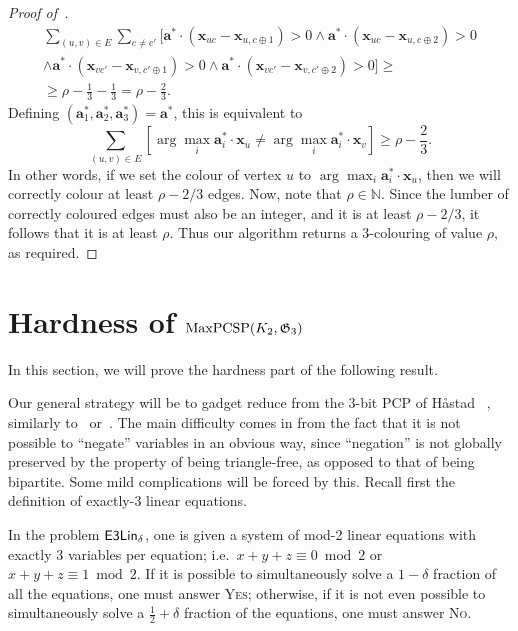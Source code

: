 \documentclass[a4paper,11pt, DIV=11]{scrartcl}
\newcommand{\vx}{\ensuremath{\mathbf{x}}}
\newcommand{\va}{\ensuremath{\mathbf{a}}}
\renewcommand{\G}{\ensuremath{\mathfrak{G}}}
\DeclareMathOperator{\elin}{\textnormal{\textsf{E3Lin}}}
\DeclareMathOperator{\maxPCSP}{\textup{MaxPCSP}}
\theoremstyle{plain}
\theoremstyle{definition}
\begin{document}
\begin{proof}[Proof of~]
\begin{multline*}
    \sum_{(u, v) \in E} \sum_{c \neq c'} [
    \va^* \cdot (\vx_{uc} -
    \vx_{u,c\oplus 1}) > 0
   \land 
    \va^* \cdot (\vx_{uc} 
    - \vx_{u,c\oplus 2}) > 0
    \\
   \land 
    \va^* \cdot (\vx_{vc'} -
    \vx_{v,c' \oplus 1}) > 0
   \land 
    \va^* \cdot (\vx_{vc'}-
     \vx_{v,c'\oplus 2}) > 0
    ] \geq \\
    \geq \rho - \frac{1}{3} - \frac{1}{3} = \rho - \frac{2}{3}.
    \end{multline*}
    Defining $(\va_1^*, \va_2^*, \va_3^*) = \va^*$, this is equivalent to
    \[
    \sum_{(u, v) \in E} [\arg \max_i \va_i^* \cdot \vx_u \neq
    \arg \max_i \va_i^* \cdot \vx_v] \geq \rho - \frac{2}{3}.
    \]
    In other words, if we set the colour of vertex $u$ to $\arg \max_i \va_i^* \cdot \vx_u$, then we will correctly colour at least $\rho - 2 / 3$ edges. Now, note that $\rho \in \mathbb{N}$. Since the lumber of correctly coloured edges must also be an integer, and it is at least $\rho - 2 / 3$, it follows that it is at least $\rho$. Thus our algorithm returns a 3-colouring of value $\rho$, as required.
\end{proof}


\section{\texorpdfstring{Hardness of $\maxPCSP(K_2, \G_3)$}{Hardness of maxPCSP(K2,G3)}}
\label{sec:hardness}

In this section, we will prove the hardness part of the following result.

\main*

Our general strategy will be to gadget reduce from the 3-bit PCP of H{\aa}stad ~\cite{Hastad01}, similarly to~\cite{Trevisan00:sicomp} or~\cite{BGS:98}. The main difficulty comes in from the fact that it is not possible to ``negate'' variables in an obvious way, since ``negation'' is not globally preserved by the property of being triangle-free, as opposed to that of being bipartite. Some mild complications will be forced by this. Recall first the definition of exactly-3 linear equations.

\begin{definition}
    In the problem $\elin_\delta$, one is given a system of mod-2 linear
    equations with exactly 3 variables per equation; i.e.~$x + y + z \equiv 0
    \bmod 2$ or $x + y + z \equiv 1 \bmod 2$. If it is possible to
    simultaneously solve a $1 - \delta$ fraction of all the equations, one must
    answer \textsc{Yes}; otherwise, if it is not even possible to simultaneously solve a $\frac{1}{2} + \delta$ fraction of the equations, one must answer \textsc{No}.
\end{definition}
\end{document}
